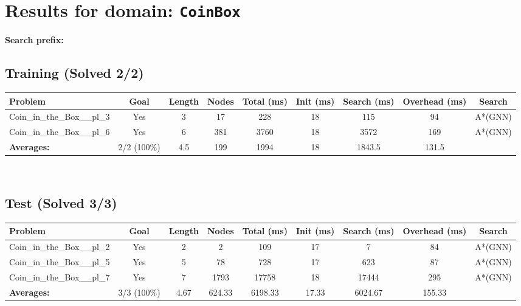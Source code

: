 \documentclass{article}
\begin{document}
\section*{Results for domain: \texttt{CoinBox}}
\textbf{Search prefix:} 
\\[0.5cm]
\subsection*{Training (Solved 2/2)}
\begin{tabular}{lcccccccc}
\toprule
Problem & Goal & Length & Nodes & Total (ms) & Init (ms) & Search (ms) & Overhead (ms) & Search \\
\midrule
Coin\_in\_the\_Box\_\_pl\_3 & Yes & 3 & 17 & 228 & 18 & 115 & 94 & A*(GNN) \\
Coin\_in\_the\_Box\_\_pl\_6 & Yes & 6 & 381 & 3760 & 18 & 3572 & 169 & A*(GNN) \\
\textbf{Averages:} & 2/2 (100\%) & 4.5 & 199 & 1994 & 18 & 1843.5 & 131.5 & \\
\bottomrule
\end{tabular}
\\[0.7cm]
\subsection*{Test (Solved 3/3)}
\begin{tabular}{lcccccccc}
\toprule
Problem & Goal & Length & Nodes & Total (ms) & Init (ms) & Search (ms) & Overhead (ms) & Search \\
\midrule
Coin\_in\_the\_Box\_\_pl\_2 & Yes & 2 & 2 & 109 & 17 & 7 & 84 & A*(GNN) \\
Coin\_in\_the\_Box\_\_pl\_5 & Yes & 5 & 78 & 728 & 17 & 623 & 87 & A*(GNN) \\
Coin\_in\_the\_Box\_\_pl\_7 & Yes & 7 & 1793 & 17758 & 18 & 17444 & 295 & A*(GNN) \\
\textbf{Averages:} & 3/3 (100\%) & 4.67 & 624.33 & 6198.33 & 17.33 & 6024.67 & 155.33 & \\
\bottomrule
\end{tabular}
\\[0.7cm]
\end{document}
